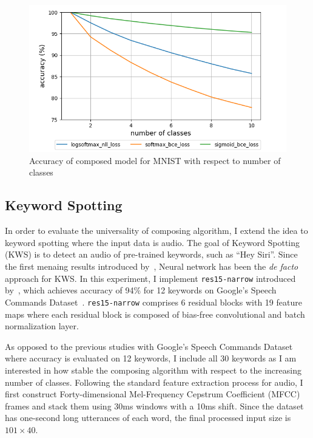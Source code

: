 \documentclass{article}
\begin{document}
\begin{figure}[t]
    \centering
    \includegraphics[scale=0.5,trim={0mm 0mm 0mm 0mm},clip]{mnist.png}
    \caption{Accuracy of composed model for MNIST with respect to number of classes}
    \label{figure:composed_mnist}
\end{figure}

\subsection{Keyword Spotting}

In order to evaluate the universality of composing algorithm, I extend the idea to keyword spotting where the input data is audio. The goal of Keyword Spotting (KWS) is to detect an audio of pre-trained keywords, such as “Hey Siri”. Since the first menaing results introduced by~\cite{chen2014small}, Neural network has been the {\it de facto} approach for KWS. In this experiment, I implement \texttt{res15-narrow} introduced by~\cite{tang2018deep}, which achieves accuracy of 94\% for 12 keywords on Google’s Speech Commands Dataset~\cite{speechcommandsdataset}. \texttt{res15-narrow} comprises 6 residual blocks with 19 feature maps where each residual block is composed of bias-free convolutional and batch normalization layer.

As opposed to the previous studies with Google’s Speech Commands Dataset where accuracy is evaluated on 12 keywords, I include all 30 keywords as I am interested in how stable the composing algorithm with respect to the increasing number of classes. Following the standard feature extraction process for audio, I first construct Forty-dimensional Mel-Frequency Cepstrum Coefficient (MFCC) frames and stack them using 30ms windows with a 10ms shift. Since the dataset has one-second long utterances of each word, the final processed input size is
$101\times40$.
\end{document}

